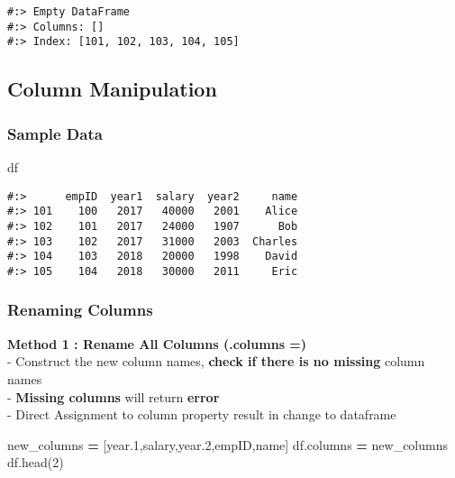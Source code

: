 \documentclass[
]{book}
\newenvironment{Shaded}{\begin{snugshade}}{\end{snugshade}}
\newcommand{\DecValTok}[1]{\textcolor[rgb]{0.06,0.06,0.06}{#1}}
\newcommand{\NormalTok}[1]{#1}
\newcommand{\OperatorTok}[1]{\textcolor[rgb]{0.43,0.43,0.43}{\textbf{#1}}}
\newcommand{\StringTok}[1]{\textcolor[rgb]{0.5,0.5,0.5}{#1}}
\begin{document}
\begin{verbatim}
#:> Empty DataFrame
#:> Columns: []
#:> Index: [101, 102, 103, 104, 105]
\end{verbatim}

\hypertarget{column-manipulation-1}{%
\subsection{Column Manipulation}\label{column-manipulation-1}}

\hypertarget{sample-data-7}{%
\subsubsection{Sample Data}\label{sample-data-7}}

\begin{Shaded}
\begin{Highlighting}[]
\NormalTok{df}
\end{Highlighting}
\end{Shaded}

\begin{verbatim}
#:>      empID  year1  salary  year2     name
#:> 101    100   2017   40000   2001    Alice
#:> 102    101   2017   24000   1907      Bob
#:> 103    102   2017   31000   2003  Charles
#:> 104    103   2018   20000   1998    David
#:> 105    104   2018   30000   2011     Eric
\end{verbatim}

\hypertarget{renaming-columns}{%
\subsubsection{Renaming Columns}\label{renaming-columns}}

\textbf{Method 1 : Rename All Columns (.columns =)}\\
- Construct the new column names, \textbf{check if there is no missing} column names\\
- \textbf{Missing columns} will return \textbf{error}\\
- Direct Assignment to column property result in change to dataframe

\begin{Shaded}
\begin{Highlighting}[]
\NormalTok{new\_columns }\OperatorTok{=}\NormalTok{ [}\StringTok{\textquotesingle{}year.1\textquotesingle{}}\NormalTok{,}\StringTok{\textquotesingle{}salary\textquotesingle{}}\NormalTok{,}\StringTok{\textquotesingle{}year.2\textquotesingle{}}\NormalTok{,}\StringTok{\textquotesingle{}empID\textquotesingle{}}\NormalTok{,}\StringTok{\textquotesingle{}name\textquotesingle{}}\NormalTok{]}
\NormalTok{df.columns }\OperatorTok{=}\NormalTok{ new\_columns}
\NormalTok{df.head(}\DecValTok{2}\NormalTok{)}
\end{Highlighting}
\end{Shaded}
\end{document}
